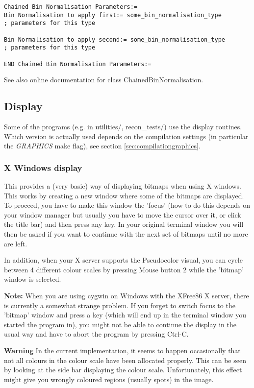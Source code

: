 \documentclass{article}
\begin{document}
{ 
}
\begin{verbatim}
Chained Bin Normalisation Parameters:=
Bin Normalisation to apply first:= some_bin_normalisation_type
; parameters for this type

Bin Normalisation to apply second:= some_bin_normalisation_type
; parameters for this type

END Chained Bin Normalisation Parameters:=
\end{verbatim}

See also online documentation for class ChainedBinNormalisation.



\subsection{
Display}

Some of the programs (e.g. in utilities/, recon\_tests/) use 
the display routines. Which version is actually used depends 
on the compilation settings (in particular the \textit{GRAPHICS} make 
flag), see section \ref{sec:compilationgraphics}. 


\subsubsection{
X Windows display}
\label{sec:display}
This provides a (very basic) way of displaying bitmaps when using 
X windows. This works by creating a new window where some of 
the bitmaps are displayed. To proceed, you have to make this 
window the 'focus' (how to do this depends on your window manager 
but usually you have to move the cursor over it, or click the 
title bar) and then press any key. In your original terminal 
window you will then be asked if you want to continue with the 
next set of bitmaps until no more are left.


In addition, when your X server supports the Pseudocolor visual, 
you can cycle between 4 different colour scales by pressing Mouse 
button 2 while the 'bitmap' window is selected.


\textbf{Note:} When you are using cygwin on Windows with the XFree86 
X server, there is currently a somewhat strange problem. If you 
forget to switch focus to the 'bitmap' window and press a key 
(which will end up in the terminal window you started the program 
in), you might not be able to continue the display in the usual 
way and have to abort the program by pressing Ctrl-C. 


\textbf{Warning} In the current implementation, it seems to happen 
occasionally that not all colours in the colour scale have been 
allocated properly. This can be seen by looking at the side bar 
displaying the colour scale. Unfortunately, this effect might 
give you wrongly coloured regions (usually spots) in the image.
\end{document}

